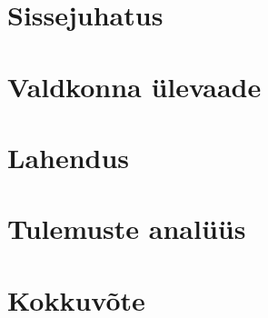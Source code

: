 

\chapter{Sissejuhatus}\label{chapter:sissejuhatus} %

\chapter{Valdkonna ülevaade}\label{chapter:taust}


\chapter{Lahendus}\label{chapter:lahendus}


\chapter{Tulemuste analüüs}\label{chapter:analüüs}


\chapter{Kokkuvõte}\label{chapter:kokkuvõte} 



